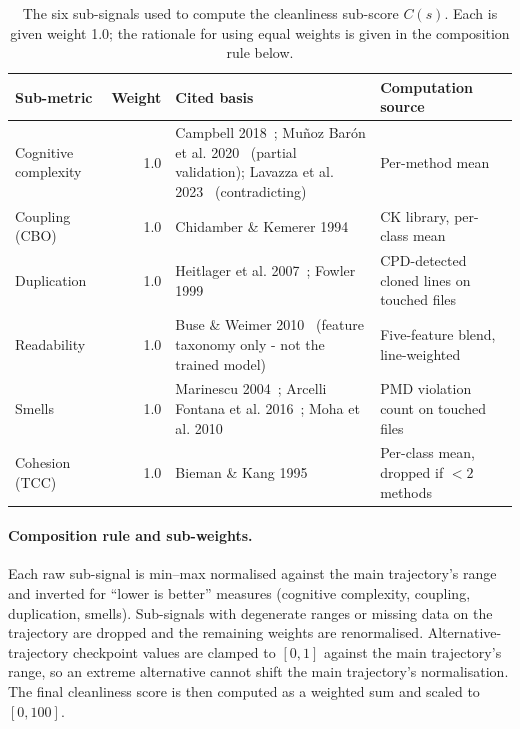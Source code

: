 \begin{table}[htbp]
\centering
\small
\begin{tabular}{l r p{} p{}}
\hline
\textbf{Sub-metric} & \textbf{Weight} & \textbf{Cited basis} & \textbf{Computation source} \\
\hline
Cognitive complexity & 1.0 & Campbell 2018~\cite{campbell2018cognitive}; Mu{\~n}oz Bar{\'o}n et al. 2020~\cite{munozbaron2020cognitive} (partial validation); Lavazza et al. 2023~\cite{lavazza2023cognitive} (contradicting) & Per-method mean \\
Coupling (CBO)        & 1.0 & Chidamber \& Kemerer 1994~\cite{chidamberkemerer1994ckmetrics} & CK library, per-class mean \\
Duplication           & 1.0 & Heitlager et al. 2007~\cite{heitlager2007sig}; Fowler 1999~\cite{fowler1999refactoring} & CPD-detected cloned lines on touched files \\
Readability           & 1.0 & Buse \& Weimer 2010~\cite{buse2010readability} (feature taxonomy only - not the trained model) & Five-feature blend, line-weighted \\
Smells                & 1.0 & Marinescu 2004~\cite{marinescu2004}; Arcelli Fontana et al. 2016~\cite{arcellifontana2016falsepositives}; Moha et al. 2010~\cite{moha2010decor} & PMD violation count on touched files \\
Cohesion (TCC)        & 1.0 & Bieman \& Kang 1995~\cite{biemankang1995tcc} & Per-class mean, dropped if $< 2$ methods \\
\hline
\end{tabular}
\caption{The six sub-signals used to compute the cleanliness sub-score $C(s)$. Each is given weight 1.0; the rationale for using equal weights is given in the composition rule below.}
\label{tab:methodology-cleanliness}
\end{table}

\paragraph{Composition rule and sub-weights.}
Each raw sub-signal is min--max normalised against the main trajectory's range and inverted for ``lower is better'' measures (cognitive complexity, coupling, duplication, smells). Sub-signals with degenerate ranges or missing data on the trajectory are dropped and the remaining weights are renormalised. Alternative-trajectory checkpoint values are clamped to $[0,1]$ against the main trajectory's range, so an extreme alternative cannot shift the main trajectory's normalisation. The final cleanliness score is then computed as a weighted sum and scaled to $[0, 100]$.

